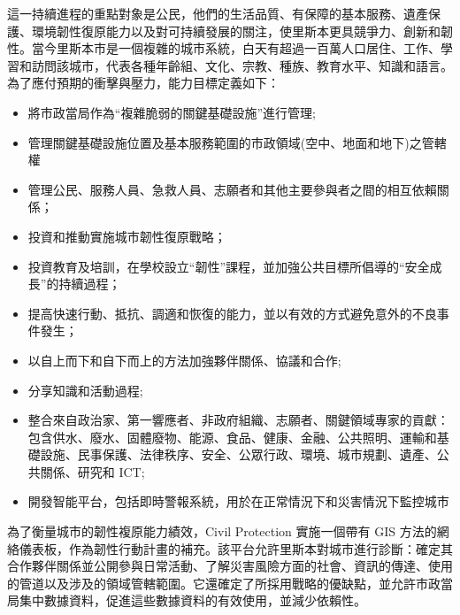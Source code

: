 \documentclass[a4paper,12pt]{article}
\begin{document}
\begin{enumerate}
這一持續進程的重點對象是公民，他們的生活品質、有保障的基本服務、遺產保護、環境韌性復原能力以及對可持續發展的關注，使里斯本更具競爭力、創新和韌性。當今里斯本市是一個複雜的城市系統，白天有超過一百萬人口居住、工作、學習和訪問該城市，代表各種年齡組、文化、宗教、種族、教育水平、知識和語言。為了應付預期的衝擊與壓力，能力目標定義如下：\\
\begin{itemize}
\item 將市政當局作為“複雜脆弱的關鍵基礎設施”進行管理;\\
\item 管理關鍵基礎設施位置及基本服務範圍的市政領域(空中、地面和地下)之管轄權\\
\item 管理公民、服務人員、急救人員、志願者和其他主要參與者之間的相互依賴關係；\\
\item 投資和推動實施城市韌性復原戰略；\\
\item 投資教育及培訓，在學校設立“韌性”課程，並加強公共目標所倡導的“安全成長”的持續過程；\\
\item 提高快速行動、抵抗、調適和恢復的能力，並以有效的方式避免意外的不良事件發生；\\
\item 以自上而下和自下而上的方法加強夥伴關係、協議和合作;\\
\item 分享知識和活動過程;\\
\item 整合來自政治家、第一響應者、非政府組織、志願者、關鍵領域專家的貢獻：包含供水、廢水、固體廢物、能源、食品、健康、金融、公共照明、運輸和基礎設施、民事保護、法律秩序、安全、公眾行政、環境、城市規劃、遺產、公共關係、研究和 ICT;\\
\item 開發智能平台，包括即時警報系統，用於在正常情況下和災害情況下監控城市\\
\end{itemize}

為了衡量城市的韌性複原能力績效，Civil Protection 實施一個帶有 GIS 方法的網絡儀表板，作為韌性行動計畫的補充。該平台允許里斯本對城市進行診斷：確定其合作夥伴關係並公開參與日常活動、了解災害風險方面的社會、資訊的傳達、使用的管道以及涉及的領域管轄範圍。它還確定了所採用戰略的優缺點，並允許市政當局集中數據資料，促進這些數據資料的有效使用，並減少依賴性。\\


\end{enumerate}
\end{document}
